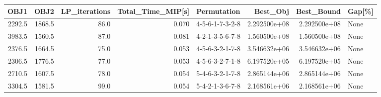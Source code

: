 \begin{tabular}{rrrrlrrl}
\toprule
   OBJ1 &    OBJ2 &  LP\_iterations &  Total\_Time\_MIP[s] &      Permutation &      Best\_Obj &    Best\_Bound & Gap[\%] \\
\midrule
 2292.5 &  1868.5 &           86.0 &              0.070 &  4-5-6-1-7-3-2-8 &  2.292500e+08 &  2.292500e+08 &   None \\
 3983.5 &  1560.5 &           87.0 &              0.081 &  4-2-1-3-5-6-7-8 &  1.560500e+08 &  1.560500e+08 &   None \\
 2376.5 &  1664.5 &           75.0 &              0.053 &  4-5-6-3-2-1-7-8 &  3.546632e+06 &  3.546632e+06 &   None \\
 2306.5 &  1776.5 &           77.0 &              0.053 &  4-5-6-3-2-7-1-8 &  6.197520e+05 &  6.197520e+05 &   None \\
 2710.5 &  1607.5 &           78.0 &              0.054 &  5-4-6-3-2-1-7-8 &  2.865144e+06 &  2.865144e+06 &   None \\
 3304.5 &  1581.5 &           99.0 &              0.054 &  5-4-2-1-3-6-7-8 &  2.168561e+06 &  2.168561e+06 &   None \\
\bottomrule
\end{tabular}
